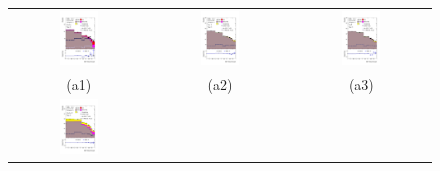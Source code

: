 \documentclass[PAPER, coverpage, atlasdraft=true, texlive=2016, UKenglish]{\ATLASLATEXPATH atlasdoc}
\begin{document}
\begin{figure}[H]
\begin{tabular}{@{}ccc@{}}
\includegraphics[width=0.3\textwidth]{figures/tcH_reg1l2tau1bnj_os.pdf}&
\includegraphics[width=0.3\textwidth]{figures/tcH_reg1l1tau1b1j_ss.pdf}&
\includegraphics[width=0.3\textwidth]{figures/tcH_reg1l1tau1b2j_ss.pdf}\\
(a1)  & (a2) & (a3) \\
\includegraphics[width=0.3\textwidth]{figures/tcH_reg1l1tau1b2j_os.pdf}&

\end{tabular}
\end{figure}
\end{document}
